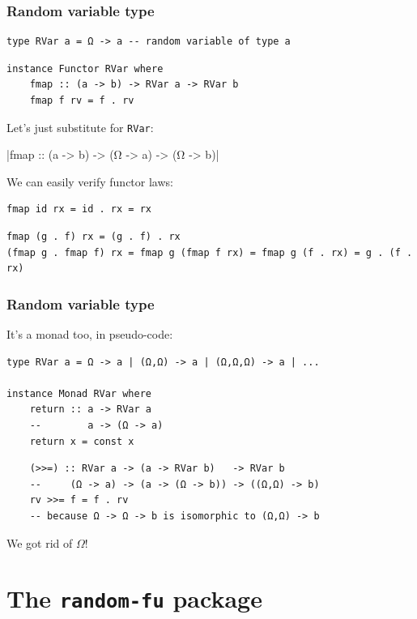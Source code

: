 \documentclass[mathserif, 8pt]{beamer}
\begin{document}
\begin{frame}[fragile]
  \frametitle{Random variable type}

\begin{verbatim}
type RVar a = Ω -> a -- random variable of type a
\end{verbatim}
  \pause
\begin{verbatim}
instance Functor RVar where
    fmap :: (a -> b) -> RVar a -> RVar b
    fmap f rv = f . rv
\end{verbatim}

\pause
  Let's just substitute for \verb|RVar|:

  |fmap :: (a -> b) -> (Ω -> a) -> (Ω -> b)|

  \pause
  We can easily verify functor laws:

\begin{verbatim}
fmap id rx = id . rx = rx
\end{verbatim}
  \pause
\begin{verbatim}
fmap (g . f) rx = (g . f) . rx
(fmap g . fmap f) rx = fmap g (fmap f rx) = fmap g (f . rx) = g . (f . rx)
\end{verbatim}
\end{frame}

\begin{frame}[fragile]
  \frametitle{Random variable type}
  It's a monad too, in pseudo-code:

\begin{verbatim}
type RVar a = Ω -> a | (Ω,Ω) -> a | (Ω,Ω,Ω) -> a | ...

instance Monad RVar where
    return :: a -> RVar a
    --        a -> (Ω -> a)
    return x = const x
\end{verbatim}
  \pause
\begin{verbatim}
    (>>=) :: RVar a -> (a -> RVar b)   -> RVar b
    --     (Ω -> a) -> (a -> (Ω -> b)) -> ((Ω,Ω) -> b)
    rv >>= f = f . rv
    -- because Ω -> Ω -> b is isomorphic to (Ω,Ω) -> b
\end{verbatim}
\pause
\alert{We got rid of $\Omega$!}

\end{frame}

\section{The \texttt{random-fu} package}
\end{document}
